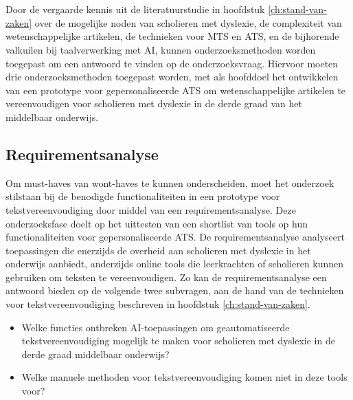 
\chapter{}%
\label{ch:methodologie}

Door de vergaarde kennis uit de literatuurstudie in hoofdstuk \ref{ch:stand-van-zaken} over de mogelijke noden van scholieren met dyslexie, de complexiteit van wetenschappelijke artikelen, de technieken voor MTS en ATS, en de bijhorende valkuilen bij taalverwerking met AI, kunnen onderzoeksmethoden worden toegepast om een antwoord te vinden op de onderzoeksvraag. Hiervoor moeten drie onderzoeksmethoden toegepast worden, met als hoofddoel het ontwikkelen van een prototype voor gepersonaliseerde ATS om wetenschappelijke artikelen te vereenvoudigen voor scholieren met dyslexie in de derde graad van het middelbaar onderwijs.

\section{Requirementsanalyse}
\label{sec:requirementsanalyse}

Om must-haves van wont-haves te kunnen onderscheiden, moet het onderzoek stilstaan bij de benodigde functionaliteiten in een prototype voor tekstvereenvoudiging door middel van een requirementsanalyse. Deze onderzoeksfase doelt op het uittesten van een shortlist van tools op hun functionaliteiten voor gepersonaliseerde ATS. De requirementsanalyse analyseert toepassingen die enerzijds de overheid aan scholieren met dyslexie in het onderwijs aanbiedt, anderzijds online tools die leerkrachten of scholieren kunnen gebruiken om teksten te vereenvoudigen. Zo kan de requirementsanalyse een antwoord bieden op de volgende twee subvragen, aan de hand van de technieken voor tekstvereenvoudiging beschreven in hoofdstuk \ref{ch:stand-van-zaken}. 

\begin{itemize}
	\item Welke functies ontbreken AI-toepassingen om geautomatiseerde tekstvereenvoudiging mogelijk te maken voor scholieren met dyslexie in de derde graad middelbaar onderwijs?
	\item Welke manuele methoden voor tekstvereenvoudiging komen niet in deze tools voor?
\end{itemize}

